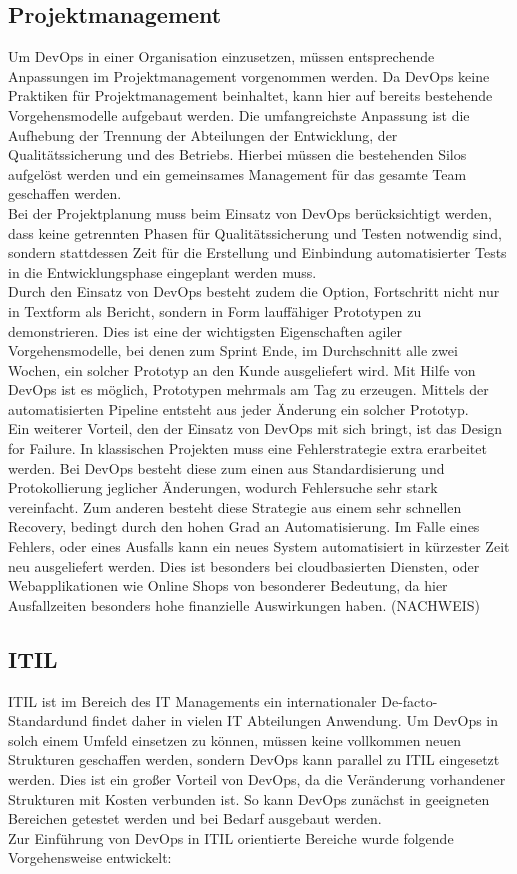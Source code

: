 \subsection{Projektmanagement}
Um DevOps in einer Organisation einzusetzen, müssen entsprechende Anpassungen im Projektmanagement vorgenommen werden. Da DevOps keine Praktiken für Projektmanagement beinhaltet, kann hier auf bereits bestehende Vorgehensmodelle aufgebaut werden. Die umfangreichste Anpassung ist die Aufhebung der Trennung der Abteilungen der Entwicklung, der Qualitätssicherung und des Betriebs. Hierbei müssen die bestehenden Silos aufgelöst werden und ein gemeinsames Management für das gesamte Team geschaffen werden.\\
Bei der Projektplanung muss beim Einsatz von DevOps berücksichtigt werden, dass keine getrennten Phasen für Qualitätssicherung und Testen notwendig sind, sondern stattdessen Zeit für die Erstellung und Einbindung automatisierter Tests in die Entwicklungsphase eingeplant werden muss.\\
Durch den Einsatz von DevOps besteht zudem die Option, Fortschritt nicht nur in Textform als Bericht, sondern in Form lauffähiger Prototypen zu demonstrieren. Dies ist eine der wichtigsten Eigenschaften agiler Vorgehensmodelle, bei denen zum Sprint Ende, im Durchschnitt alle zwei Wochen, ein solcher Prototyp an den Kunde ausgeliefert wird. Mit Hilfe von DevOps ist es möglich, Prototypen mehrmals am Tag zu erzeugen. Mittels der automatisierten Pipeline entsteht aus jeder Änderung ein solcher Prototyp.\\
Ein weiterer Vorteil, den der Einsatz von DevOps mit sich bringt, ist das \glqq Design for Failure\grqq. In klassischen Projekten muss eine Fehlerstrategie extra erarbeitet werden. Bei DevOps besteht diese zum einen aus Standardisierung und Protokollierung jeglicher Änderungen, wodurch Fehlersuche sehr stark vereinfacht. Zum anderen besteht diese Strategie aus einem sehr schnellen Recovery, bedingt durch den hohen Grad an Automatisierung. Im Falle eines Fehlers, oder eines Ausfalls kann ein neues System automatisiert in kürzester Zeit neu ausgeliefert werden. Dies ist besonders bei cloudbasierten Diensten, oder Webapplikationen wie Online Shops von besonderer Bedeutung, da hier Ausfallzeiten besonders hohe finanzielle Auswirkungen haben. (NACHWEIS)

\subsection{ITIL}
ITIL ist im Bereich des IT Managements ein internationaler \glqq De-facto-Standard\grqq und findet daher in vielen IT Abteilungen Anwendung. Um DevOps in solch einem Umfeld einsetzen zu können, müssen keine vollkommen neuen Strukturen geschaffen werden, sondern DevOps kann parallel zu ITIL eingesetzt werden. Dies ist ein großer Vorteil von DevOps, da die Veränderung vorhandener Strukturen mit Kosten verbunden ist. So kann DevOps zunächst in geeigneten Bereichen getestet werden und bei Bedarf ausgebaut werden.\\
Zur Einführung von DevOps in ITIL orientierte Bereiche wurde folgende Vorgehensweise entwickelt:

